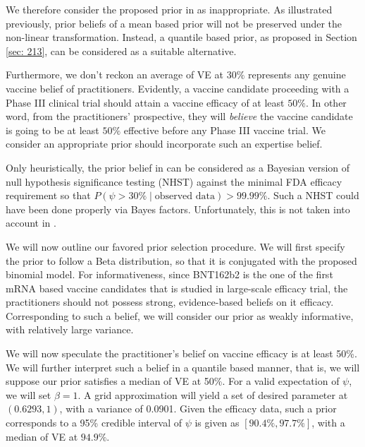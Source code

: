 \documentclass[12pt]{amsart}
\begin{document}
We therefore consider the proposed prior in \cite{paper} as inappropriate. As illustrated previously, prior beliefs of a mean based prior will not be preserved under the non-linear transformation. Instead, a quantile based prior, as proposed in Section \ref{sec: 213}, can be considered as a suitable alternative.

Furthermore, we don't reckon an average of VE at $30\%$ represents any genuine vaccine belief of practitioners. Evidently, a vaccine candidate proceeding with a Phase III clinical trial should attain a vaccine efficacy of at least $50\%$. In other word, from the practitioners' prospective, they will \textit{believe} the vaccine candidate is going to be at least $50\%$ effective before any Phase III vaccine trial. We consider an appropriate prior should incorporate such an expertise belief.

Only heuristically, the prior belief in \cite{paper} can be considered as a Bayesian version of null hypothesis significance testing (NHST) against the minimal FDA efficacy requirement so that $P\left(\psi > 30\% \mid \text{observed data} \right) > 99.99\%.$ Such a NHST could have been done properly via Bayes factors. Unfortunately, this is not taken into account in \cite{paper}.

We will now outline our favored prior selection procedure. We will first specify the prior to follow a Beta distribution, so that it is conjugated with the proposed binomial model. For informativeness, since BNT162b2 is the one of the first mRNA based vaccine candidates that is studied in large-scale efficacy trial, the practitioners should not possess strong, evidence-based beliefs on it efficacy. Corresponding to such a belief, we will consider our prior as weakly informative, with relatively large variance.

We will now speculate the practitioner's belief on vaccine efficacy is at least 50\%. We will further interpret such a belief in a quantile based manner, that is, we will suppose our prior satisfies a median of VE at 50\%. For a valid expectation of $\psi$, we will set $\beta = 1$. A grid approximation will yield a set of desired parameter at $(0.6293, 1)$, with a variance of 0.0901. Given the efficacy data, such a prior corresponds to a 95\% credible interval of $\psi$ is given as $[90.4\%, 97.7\%]$, with a median of VE at $94.9\%$.
\end{document}
